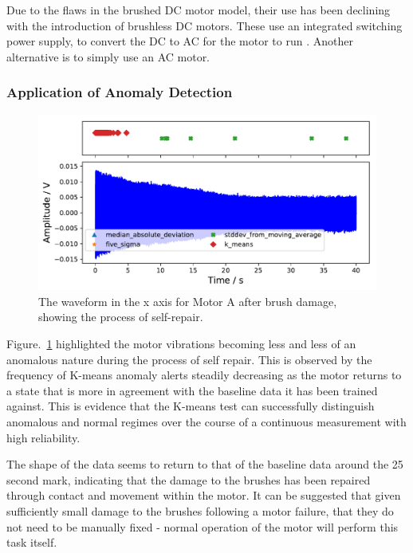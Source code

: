 Due to the flaws in the brushed DC motor model, their use has been declining with the introduction of brushless DC motors. These use an integrated switching power supply, to convert the DC to AC for the motor to run \cite{hanselman2003brushless}. Another alternative is to simply use an AC motor. 

\subsubsection{Application of Anomaly Detection}

\begin{figure}[t]
    \includegraphics[width=1.0\textwidth]{fig/large_manual_repair_large_12V.pdf}
    \caption[Anomaly Test Brush Damage]{The waveform in the x axis for Motor A after brush damage, showing the process of self-repair.}
    \label{fig:largemotor_brushdamage}
\end{figure}

Figure.~\ref{fig:largemotor_brushdamage} highlighted the motor vibrations becoming less and less of an anomalous nature during the process of self repair. This is observed by the frequency of K-means anomaly alerts steadily decreasing as the motor returns to a state that is more in agreement with the baseline data it has been trained against. This is evidence that the K-means test can successfully distinguish anomalous and normal regimes over the course of a continuous measurement with high reliability. 

The shape of the data seems to return to that of the baseline data around the 25 second mark, indicating that the damage to the brushes has been repaired through contact and movement within the motor. It can be suggested that given sufficiently small damage to the brushes following a motor failure, that they do not need to be manually fixed - normal operation of the motor will perform this task itself.


